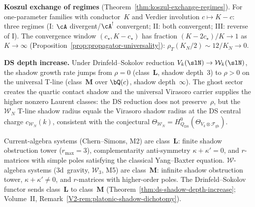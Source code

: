 \smallskip\noindent\textbf{Koszul exchange of regimes}
(Theorem~\ref{thm:koszul-exchange-regimes}).
For one-parameter families with conductor~$K$ and
Verdier involution $c \mapsto K - c$:
three regimes (I: $\cA$ divergent/$\cA^!$ convergent;
II: both convergent; III: reverse of I).
The convergence window $(c_\star, K - c_\star)$
has fraction $(K - 2c_\star)/K \to 1$ as $K \to \infty$
(Proposition~\ref{prop:propagator-universality}):
$\rho_T(K_N/2) \sim 12/K_N \to 0$.

\smallskip\noindent\textbf{DS depth increase.}
Under Drinfeld--Sokolov reduction
$V_k(\slN) \to \mathcal{W}_k(\slN)$, the shadow growth
rate jumps from $\rho = 0$ (class~$\mathbf{L}$, shadow depth~$3$)
to $\rho > 0$ on the universal T-line (class~$\mathbf{M}$ over
$\bQ(c)$, shadow depth~$\infty$).
The ghost sector creates the quartic contact shadow and the universal
Virasoro carrier supplies the higher nonzero Laurent classes: the DS
reduction does not preserve~$\rho$,
but the $\mathcal{W}_N$ T-line shadow radius equals the
Virasoro shadow radius at the DS central charge
$c_{\mathcal{W}_N}(k)$, consistent with the conjectural
$\Theta_{\mathcal{W}_N} = H^0_{Q_{\mathrm{DS}}}(\Theta_{V_k
\otimes \mathcal{F}_{\mathrm{gh}}})$.

\begin{principle}
\label{princ:shadow-depth-escalator}
Current-algebra systems \textup{(}Chern--Simons, M2\textup{)}
are class~$\mathbf{L}$: finite shadow obstruction tower
($r_{\max} = 3$), complementarity anti-symmetry
$\kappa + \kappa' = 0$, and $r$-matrices with simple poles
satisfying the classical Yang--Baxter equation.
$\mathcal{W}$-algebra systems \textup{(}3d~gravity,
$\mathcal{W}_3$, M5\textup{)} are class~$\mathbf{M}$:
infinite shadow obstruction tower, $\kappa + \kappa' \neq 0$,
and $r$-matrices with higher-order poles.
The Drinfeld--Sokolov functor sends
class~$\mathbf{L}$ to class~$\mathbf{M}$
\textup{(}Theorem~\ref{thm:ds-shadow-depth-increase};
Volume~II,
Remark~\ref*{V2-rem:platonic-shadow-dichotomy}\textup{)}.
\end{principle}

